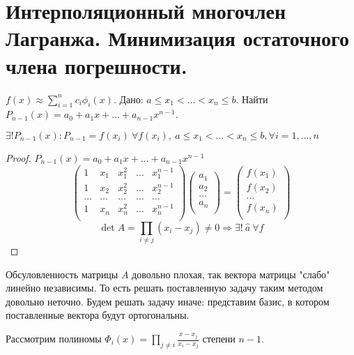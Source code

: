 \section{Интерполяционный многочлен Лагранжа. Минимизация остаточного члена погрешности.}
\begin{task}
  $f(x)\approx \sum_{i=1}^nc_i\phi_i(x)$.
  Дано: $a\leq x_1<\ldots<x_n\leq b$. Найти $P_{n-1}(x)=a_0+a_1x+\ldots+a_{n-1}x^{n-1}$.
\end{task}
\begin{theorem}
  $\exists !P_{n-1}(x): P_{n-1}=f(x_i)\ \forall f(x_i),\ a\leq x_1<\ldots<x_n\leq b, \forall i=1,\ldots,n$
\end{theorem}
\begin{proof}
  $P_{n-1}(x)=a_0+a_1x+\ldots+a_{n-1}x^{n-1}$
  $$
    \left(\begin{array}{ccccc}
        1      & x_1    & x_1^2  & \ldots & x_1^{n-1} \\
        1      & x_2    & x_2^2  & \ldots & x_2^{n-1} \\
        \ldots & \ldots & \ldots & \ldots & \ldots    \\
        1      & x_n    & x_n^2  & \ldots & x_n^{n-1} \\
      \end{array}\right)
    \left(\begin{array}{c}
        a_1    \\
        a_2    \\
        \ldots \\
        a_n    \\
      \end{array}\right)=
    \left(\begin{array}{c}
        f(x_1) \\
        f(x_2) \\
        \ldots \\
        f(x_n) \\
      \end{array}\right)
  $$
  $$ \det A = \prod_{i\neq j}(x_i-x_j)\neq0\Rightarrow\exists!\ \hat{a}\ \forall f$$
\end{proof}
\begin{remark*}
  Обсуловленность матрицы $A$ довольно плохая, так вектора матрицы "слабо" линейно независимы.
  То есть решать поставленную задачу таким методом довольно неточно. Будем решать задачу иначе:
  представим базис, в котором поставленные вектора будут ортогональны.
\end{remark*}
Рассмотрим полиномы $\Phi_i(x)=\prod_{j\neq i}\frac{x-x_j}{x_i-x_j}$ степени $n-1$.
